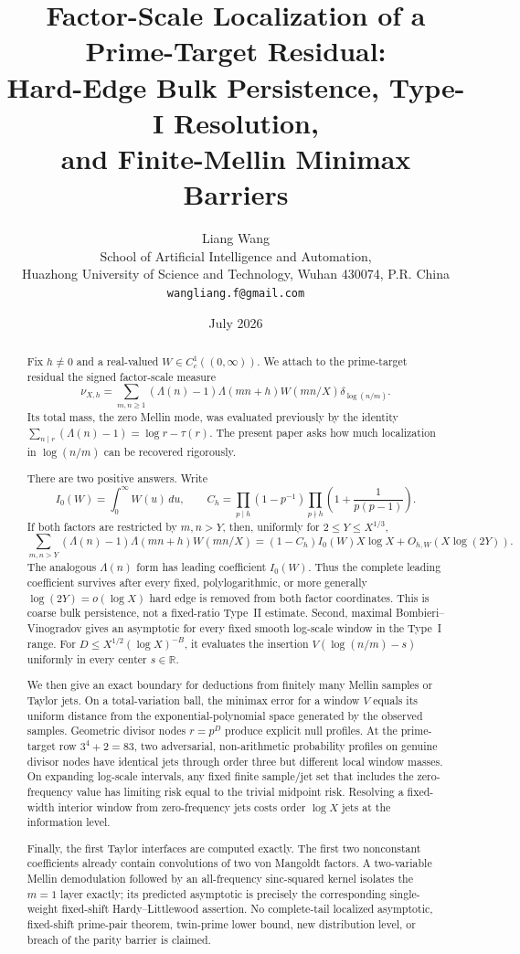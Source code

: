 \documentclass[11pt]{article}
\title{\textbf{Factor-Scale Localization of a Prime-Target Residual:}\\
\textbf{Hard-Edge Bulk Persistence, Type-I Resolution,}\\
\textbf{and Finite-Mellin Minimax Barriers}}
\author{Liang Wang\\
\small School of Artificial Intelligence and Automation,\\[-0.2em]
\small Huazhong University of Science and Technology, Wuhan 430074, P.R. China\\
\small \texttt{wangliang.f@gmail.com}}
\date{July 2026}
\theoremstyle{definition}
\theoremstyle{remark}
\newcommand{\R}{\mathbb R}
\begin{document}
\maketitle

\begin{abstract}
Fix $h\ne0$ and a real-valued $W\in C_c^1((0,\infty))$.  We attach to the
prime-target residual the signed factor-scale measure
\[
 \nu_{X,h}=\sum_{m,n\geq1}(\Lambda(n)-1)\Lambda(mn+h)W(mn/X)
 \delta_{\log(n/m)}.
\]
Its total mass, the zero Mellin mode, was evaluated previously by the
identity $\sum_{n\mid r}(\Lambda(n)-1)=\log r-\tau(r)$.  The present paper
asks how much localization in $\log(n/m)$ can be recovered rigorously.

There are two positive answers.  Write
\[
 I_0(W)=\int_0^\infty W(u)\,du,\qquad
 C_h=\prod_{p\mid h}(1-p^{-1})
     \prod_{p\nmid h}\left(1+\frac1{p(p-1)}\right).
\]
If both factors are restricted by $m,n>Y$, then, uniformly for
$2\leq Y\leq X^{1/3}$,
\[
 \sum_{m,n>Y}(\Lambda(n)-1)\Lambda(mn+h)W(mn/X)
 =(1-C_h)I_0(W)X\log X+O_{h,W}(X\log(2Y)).
\]
The analogous $\Lambda(n)$ form has leading coefficient $I_0(W)$.  Thus
the complete leading coefficient survives after every fixed,
polylogarithmic, or more generally $\log(2Y)=o(\log X)$ hard edge is removed
from both factor coordinates.  This is coarse bulk persistence, not a
fixed-ratio Type~II estimate.  Second, maximal Bombieri--Vinogradov gives
an asymptotic for every fixed smooth log-scale window in the Type~I range.
For $D\leq X^{1/2}(\log X)^{-B}$, it evaluates the insertion
$V(\log(n/m)-s)$ uniformly in every center $s\in\R$.

We then give an exact boundary for deductions from finitely many Mellin
samples or Taylor jets.  On a total-variation ball, the minimax error for a
window $V$ equals its uniform distance from the exponential-polynomial
space generated by the observed samples.  Geometric divisor nodes
$r=p^D$ produce explicit null profiles.  At the prime-target row
$3^4+2=83$, two adversarial, non-arithmetic probability profiles on genuine
divisor nodes have identical jets through order three but different local
window masses.  On expanding log-scale intervals, any fixed finite
sample/jet set
that includes the zero-frequency value has limiting risk equal to the
trivial midpoint risk.  Resolving a fixed-width interior window from
zero-frequency jets costs order $\log X$ jets at the information level.

Finally, the first Taylor interfaces are computed exactly.  The first two
nonconstant coefficients already contain convolutions of two von
Mangoldt factors.  A two-variable Mellin demodulation followed by an
all-frequency sinc-squared kernel isolates the $m=1$ layer exactly; its
predicted asymptotic is precisely the corresponding single-weight
fixed-shift Hardy--Littlewood assertion.  No complete-tail localized asymptotic,
fixed-shift prime-pair theorem, twin-prime lower bound, new distribution
level, or breach of the parity barrier is claimed.
\end{abstract}
\end{document}
